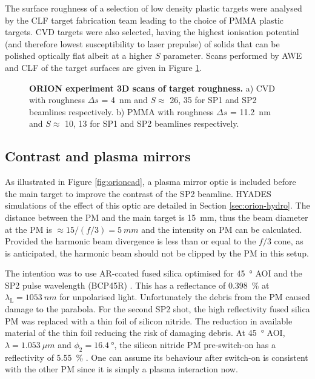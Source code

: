 The surface roughness of a selection of low density plastic targets were analysed by the CLF target fabrication team leading to the choice of PMMA plastic targets. CVD targets were also selected, having the highest ionisation potential (and therefore lowest susceptibility to laser prepulse) of solids that can be polished optically flat albeit at a higher $S$ parameter. Scans performed by AWE and CLF of the target surfaces are given in Figure \ref{fig:oriontargets}.
\begin{figure}
	\centering
	\caption[ORION HHG experiment targets]{\textbf{ORION experiment 3D scans of target roughness.} a) CVD with roughness $\Delta s$ = \qty{4}{nm} and $S \approx$ 26, 35 for SP1 and SP2 beamlines respectively. b) PMMA with roughness $\Delta s$ = \qty{11.2}{nm} and $S \approx$ 10, 13 for SP1 and SP2 beamlines respectively.}
	\label{fig:oriontargets}
\end{figure}

\subsection{Contrast and plasma mirrors}
As illustrated in Figure \ref{fig:orioncad}, a plasma mirror optic is included before the main target to improve the contrast of the SP2 beamline. HYADES simulations of the effect of this optic are detailed in Section \ref{sec:orion-hydro}. The distance between the PM and the main target is \qty{15}{mm}, thus the beam diameter at the PM is $\approx 15/(f/3) = \qty{5}{mm}$ and the intensity on PM can be calculated. Provided the harmonic beam divergence is less than or equal to the $f/3$ cone, as is anticipated, the harmonic beam should not be clipped by the PM in this setup. 

The intention was to use \ac{AR}-coated fused silica optimised for \qty{45}{\degree} \ac{AOI} and the SP2 pulse wavelength (BCP45R) \cite{45AOIBeamsplitter}. This has a reflectance of \qty{0.398}{\%} at $\lambda_\mathrm{L} = \qty{1053}{nm}$ for unpolarised light. Unfortunately the debris from the PM caused damage to the parabola. For the second SP2 shot, the high reflectivity fused silica PM was replaced with a thin foil of silicon nitride. The reduction in available material of the thin foil reducing the risk of damaging debris. At \qty{45}{\degree} \ac{AOI}, $\lambda = \qty{1.053}{\mu m}$ and $\phi_2 = \qty{16.4}{\degree}$, the silicon nitride PM pre-switch-on has a reflectivity of \qty{5.55}{\%} \cite{polyanskiyRefractiveindexInfoDatabase2024}. One can assume its behaviour after switch-on is consistent with the other PM since it is simply a plasma interaction now.

